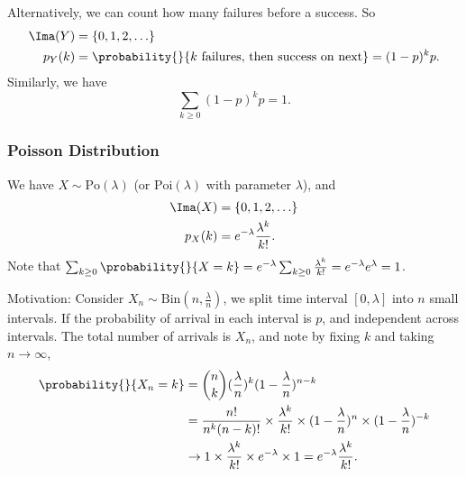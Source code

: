 Alternatively, we can count how many failures before a success. So
\begin{align*}
    \Ima(Y) &= \{0,1,2, \ldots\}\\
    p_Y(k) &= \probability{}{k \text{ failures, then success on next}} = (1-p)^k p.
\end{align*}
Similarly, we have
\[
    \sum\limits_{k\geq 0}(1-p)^{k}p = 1.
\]
\subsubsection{Poisson Distribution}
We have \(X \sim \mathrm{Po}(\lambda)\) (or \(\mathrm{Poi}(\lambda)\) with parameter \(\lambda\)), and
\begin{align*}
    \Ima(X) &= \{0,1,2, \ldots\}\\
    p_X(k) &= e^{-\lambda}\frac{\lambda^k}{k!}.
\end{align*}
Note that \(\sum_{k\geq 0} \probability{}{X = k} = e^{-\lambda} \sum_{k\geq 0}\frac{\lambda^k}{k!}=e^{-\lambda}e^{\lambda} = 1\).

Motivation: Consider \(X_n \sim \mathrm{Bin}(n, \frac{\lambda}{n})\), we split time interval \([0, \lambda]\) into \(n\) small intervals. If the probability of arrival in each interval is \(p\), and independent across intervals. The total number of arrivals is \(X_n\), and note by fixing \(k\) and taking \(n \to \infty\),
\begin{align*}
    \probability{}{X_n = k} &= \binom{n}{k}(\frac{\lambda}{n})^k(1-\frac{\lambda}{n})^{n-k}\\
    &= \frac{n!}{n^k(n-k)!} \times \frac{\lambda^k}{k!}\times (1-\frac{\lambda}{n})^n \times (1-\frac{\lambda}{n})^{-k}\\
    &\to 1 \times \frac{\lambda^k}{k!} \times e^{-\lambda} \times 1 = e^{-\lambda}\frac{\lambda^k}{k!}.
\end{align*}

